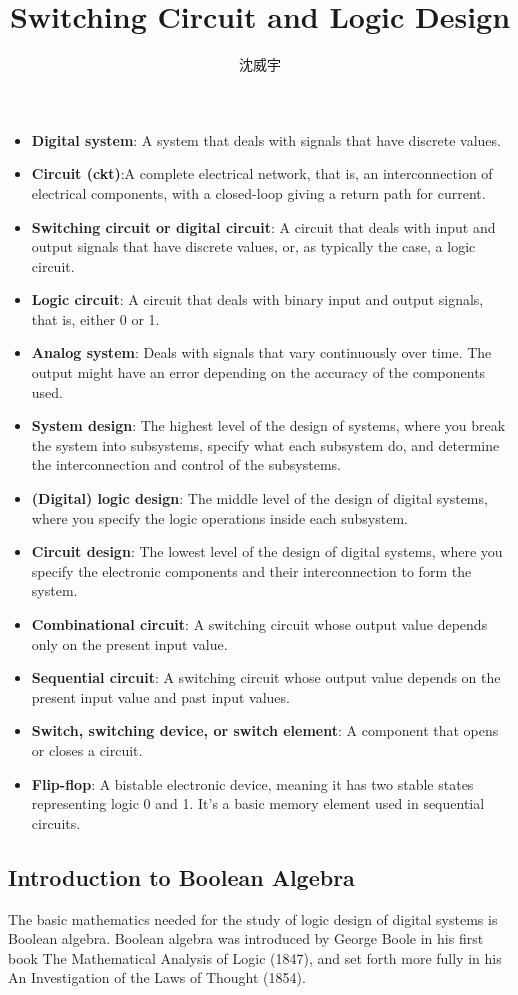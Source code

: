 \documentclass[a4paper,12pt]{article}
\begin{document}
\title{Switching Circuit and Logic Design}
\author{沈威宇}
\date{\temtoday}
\titletocdoc
{}
\begin{itemize}
\item\textbf{Digital system}: A system that deals with signals that have discrete values.
\item\textbf{Circuit (ckt)}:A complete electrical network, that is, an interconnection of electrical components, with a closed-loop giving a return path for current.
\item\textbf{Switching circuit or digital circuit}: A circuit that deals with input and output signals that have discrete values, or, as typically the case, a logic circuit.
\item\textbf{Logic circuit}: A circuit that deals with binary input and output signals, that is, either 0 or 1.
\item\textbf{Analog system}: Deals with signals that vary continuously over time. The output might have an error depending on the accuracy of the components used.
\item\textbf{System design}: The highest level of the design of systems, where you break the system into subsystems, specify what each subsystem do, and determine the interconnection and control of the subsystems.
\item\textbf{(Digital) logic design}: The middle level of the design of digital systems, where you specify the logic operations inside each subsystem.
\item\textbf{Circuit design}: The lowest level of the design of digital systems, where you specify the electronic components and their interconnection to form the system.
\item\textbf{Combinational circuit}: A switching circuit whose output value depends only on the present input value.
\item\textbf{Sequential circuit}: A switching circuit whose output value depends on the present input value and past input values.
\item\textbf{Switch, switching device, or switch element}: A component that opens or closes a circuit.
\item\textbf{Flip-flop}: A bistable electronic device, meaning it has two stable states representing logic 0 and 1. It's a basic memory element used in sequential circuits.
\end{itemize}
\subsection{Introduction to Boolean Algebra}
The basic mathematics needed for the study of logic design of digital systems is Boolean algebra. Boolean algebra was introduced by George Boole in his first book The Mathematical Analysis of Logic (1847), and set forth more fully in his An Investigation of the Laws of Thought (1854).
\end{document}
